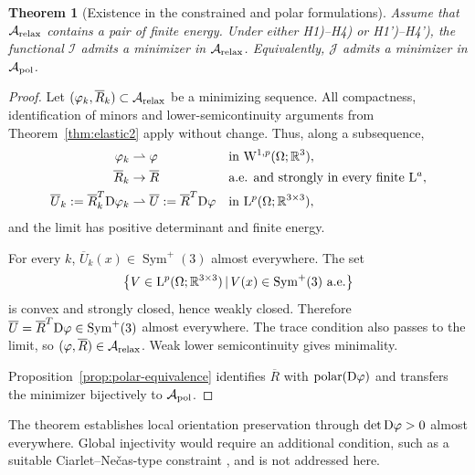 \documentclass[11pt]{article}
\newtheorem{theorem}{Theorem}[section]
\begin{document}
\begin{theorem}[Existence in the constrained and polar formulations]
\label{thm:elastic3}
Assume that $\mathcal A_{\rm relax}$ contains a pair of finite energy. Under either H1)--H4) or H1')--H4'), the functional $\mathcal I$ admits a minimizer in $\mathcal A_{\rm relax}$. Equivalently, $\mathcal J$ admits a minimizer in $\mathcal A_{\rm pol}$.
\end{theorem}

\begin{proof}
Let $(\varphi_k, \overline R _k)\subset\mathcal A_{\rm relax}$ be a minimizing sequence. All compactness, identification of minors and lower-semicontinuity arguments from Theorem~\ref{thm:elastic2} apply without change. Thus, along a subsequence,
\begin{align}
\varphi_k&\rightharpoonup\varphi
&&\text{in }{\rm W}^{1,p}(\Omega;\mathbb R^3),
\notag\\
 \overline R _k&\to \overline  R 
&&\text{a.e. and strongly in every finite }{\rm L}^a,
\notag\\
\overline U_k:= \overline R _k^T{\rm D}\varphi_k
&\rightharpoonup
\overline U:= \overline R ^T{\rm D}\varphi
&&\text{in }{\rm L}^p(\Omega;\mathbb R^{3\times3}),
\end{align}
and the limit has positive determinant and finite energy.

For every $k$,
$
\overline U_k(x)\in\operatorname{Sym}^{+}(3)
$
almost everywhere. The set
\begin{align}
\left\{
V\in {\rm L}^p(\Omega;\mathbb R^{3\times3})\, |\,
V(x)\in\operatorname{Sym}^{+}(3)\ \text{a.e.}
\right\}
\end{align}
is convex and strongly closed, hence weakly closed. Therefore
$
\overline U= \overline R ^T{\rm D}\varphi\in\operatorname{Sym}^{+}(3)
$
almost everywhere. The trace condition also passes to the limit, so $(\varphi, \overline R )\in\mathcal A_{\rm relax}$. Weak lower semicontinuity gives minimality.

Proposition~\ref{prop:polar-equivalence} identifies $ \overline R $ with $\operatorname{polar}({\rm D}\varphi)$ and transfers the minimizer bijectively to $\mathcal A_{\rm pol}$.
\end{proof}


The theorem establishes local orientation preservation through $\det{\rm D}\varphi>0$ almost everywhere. Global injectivity would require an additional condition, such as a suitable
Ciarlet--Ne\v{c}as-type constraint \cite{CiarletNecas1987}, and is not
addressed here.
\end{document}
